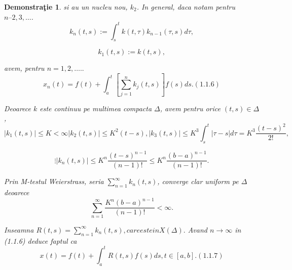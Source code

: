 \documentclass[a4paper,12pt,oneside]{report}
\newtheorem{demonstration}{Demonstra\c tie}
\begin{document}
\begin{demonstration}
	si au un nucleu nou,  \(k_{2}\). In general, daca notam pentru \(n – 2,3,…\).
	\begin{displaymath}
		k_{n}\left ( t,s \right ) := \int_{s}^{t}k\left ( t,\tau  \right )k_{n-1}\left ( \tau ,s \right )d\tau,
	\end{displaymath}
					
	\begin{displaymath}
		k_{1}\left ( t,s \right ) := k\left ( t,s \right ), 
	\end{displaymath}
					
	avem, pentru \(n = 1,2,…..\)
	\begin{displaymath}
		x_{n}\left ( t \right ) = f\left ( t \right ) + \int_{a}^{t}\left [ \sum_{j= 1}^{n}k_{j}\left ( t,s \right ) \right ]f\left ( s \right )ds. (1.1.6)
	\end{displaymath}
					
	Deoarece \(k\) este continuu pe multimea compacta \(\Delta\), avem pentru orice \(\left ( t,s \right ) \in \Delta\),
	\begin{displaymath}
		\left | k_{1}\left ( t,s \right ) \right |\leq K< \infty
		\left | k_{2}\left ( t,s \right ) \right |\leq K^{2}\left ( t-s \right ),
		\left | k_{3}\left ( t,s \right ) \right |\leq K^{3}\int_{s}^{t}\left | \tau - s \right |d\tau  = K^{3}\frac{\left ( t-s \right )^{2}}{2!},
	\end{displaymath}
					 
	\begin{displaymath}
		\vdots
		\left | k_{n}\left ( t,s \right ) \right |\leq K^{n}\frac{\left ( t-s \right )^{n-1}}{\left ( n-1 \right )!}\leq K^{n}\frac{\left ( b-a \right )^{n-1}}{\left ( n-1 \right )!}. 
	\end{displaymath}
					
	Prin M-testul Weierstrass, seria \(\sum_{n=1}^{\infty }k_{n}\left ( t,s \right )\), converge clar uniform pe \(\Delta\) deoarece 
	\begin{displaymath}
		\sum_{n=1}^{\infty }\frac{K^{n}\left ( b-a \right )^{n-1}}{\left ( n-1 \right )!}< \infty.
	\end{displaymath}
					
	Inseamna 
	\(R\left ( t,s \right ) = \sum_{n=1}^{\infty }k_{n}\left ( t,s \right ), 
	care este in X\left ( \Delta  \right ).\) Avand \(n\rightarrow \infty\) in (1.1.6) deduce faptul ca 
	\begin{displaymath}
		x\left ( t \right ) = f\left ( t \right ) + \int_{a}^{t}R\left ( t,s \right )f\left ( s \right )ds, t\in \left [ a,b \right ]. (1.1.7)
	\end{displaymath}
					

\end{demonstration}
\end{document}
